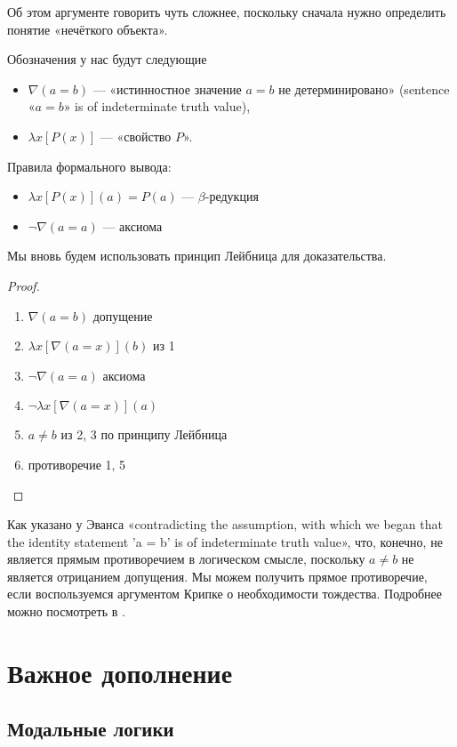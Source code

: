 \documentclass[openany]{book}
\theoremstyle{plain}
\theoremstyle{definition}
\begin{document}
Об этом аргументе говорить чуть сложнее, поскольку сначала нужно определить понятие «нечёткого объекта».

Обозначения у нас будут следующие
\begin{itemize}
    \item \(\nabla (a = b)\) — «истинностное значение \(a = b\) не детерминировано» (sentence «\(a = b\)» is of indeterminate truth value),
    \item \(\lambda x [P(x)]\) — «свойство \(P\)».
\end{itemize}

Правила формального вывода:
\begin{itemize}
    \item \(\lambda x [P(x)](a) = P(a)\) — \(\beta\)-редукция
    \item \(\neg \nabla (a = a)\) — аксиома
\end{itemize}

Мы вновь будем использовать принцип Лейбница для доказательства.

\begin{proof}
    \begin{enumerate}
	\item \(\nabla (a = b)\) допущение
	\item \(\lambda x [\nabla(a = x)](b)\) из 1
	\item \(\neg \nabla(a = a)\) аксиома
	\item \(\neg \lambda x [\nabla(a = x)](a)\)
	\item \(a \not= b\) из 2, 3 по принципу Лейбница
	\item противоречие 1, 5
    \end{enumerate}
\end{proof}

Как указано у Эванса «contradicting the assumption, with which we began that the identity statement 'a = b' is of indeterminate truth value», что, конечно, не является прямым противоречием в логическом смысле, поскольку \(a \not= b\) не является отрицанием допущения. Мы можем получить прямое противоречие, если воспользуемся аргументом Крипке о необходимости тождества. Подробнее можно посмотреть в \cite{Evans}.

\section{Важное дополнение}
\subsection{Модальные логики}
\end{document}
